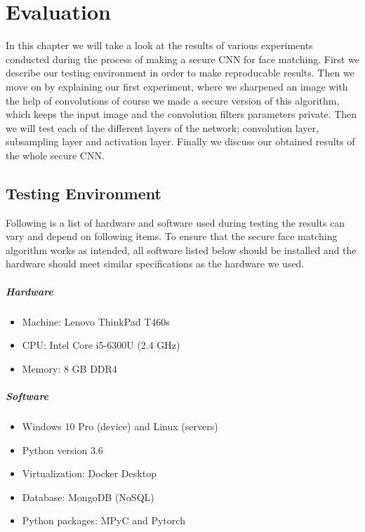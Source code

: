 \chapter{Evaluation}
\label{chapter:evaluation}

In this chapter we will take a look at the results of various experiments conducted during the process of making a secure CNN for face matching. First we describe our testing environment in order to make reproducable results. Then we move on by explaining our first experiment, where we sharpened an image with the help of convolutions of course we made a secure version of this algorithm, which keeps the input image and the convolution filters parameters private. Then we will test each of the different layers of the network; convolution layer, subsampling layer and activation layer. Finally we discuss our obtained results of the whole secure CNN.

\section{Testing Environment}
Following is a list of hardware and software used during testing the results can vary and depend on following items. To ensure that the secure face matching algorithm works as intended, all software listed below should be installed and the hardware should meet similar specifications as the hardware we used.

\paragraph{Hardware}
\begin{itemize}
  \item Machine: Lenovo ThinkPad T460s
  \item CPU: Intel Core i5-6300U (2.4 GHz)
  \item Memory: 8 GB DDR4
\end{itemize}

\paragraph{Software}
\begin{itemize}
  \item Windows 10 Pro (device) and Linux (servers)
  \item Python version 3.6
  \item Virtualization: Docker Desktop
  \item Database: MongoDB (NoSQL)
  \item Python packages: MPyC and Pytorch
\end{itemize}

